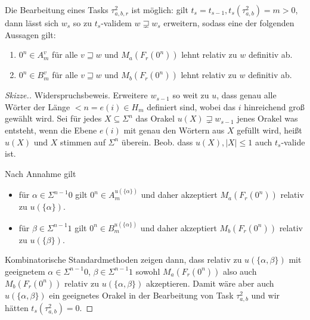 \begin{lemma}\label{lemma:myoracle-disjnp}
    Die Bearbeitung eines Tasks $\tau^2_{a,b,r}$ ist möglich: gilt $t_s=t_{s-1}, t_{s}(\tau^2_{a,b})=m>0$, dann lässt sich $w_{s}$ so zu $t_{s}$-validem $w\sqsupsetneq w_{s}$ erweitern, sodass eine der folgenden Aussagen gilt:
    \begin{enumerate}[nosep,endpenalty=10000]
        \item $0^n\in A_m^v$ für alle $v\sqsupseteq w$ und $M_a(F_r(0^n))$ lehnt relativ zu $w$ definitiv ab.
        \item $0^n\in B_m^v$ für alle $v\sqsupseteq w$ und $M_b(F_r(0^n))$ lehnt relativ zu $w$ definitiv ab.
    \end{enumerate}
\end{lemma}
\begin{proof}[Skizze.]
    Widerspruchsbeweis. Erweitere $w_{s-1}$ so weit zu $u$, dass genau alle Wörter der Länge $<n=e(i)\in H_m$ definiert sind, wobei das $i$ hinreichend groß gewählt wird. Sei für jedes $X\subseteq \Sigma^n$ das Orakel $u(X)\sqsupsetneq w_{s-1}$ jenes Orakel was entsteht, wenn die Ebene $e(i)$ mit genau den Wörtern aus $X$ gefüllt wird, heißt $u(X)$ und $X$ stimmen auf $\Sigma^n$ überein. Beob. dass $u(X), |X|\leq 1$ auch $t_{s}$-valide ist.

    Nach Annahme gilt
    \begin{itemize}[nosep]
        \item für $\alpha\in \Sigma^{n-1}0$ gilt $0^n\in A_m^{u(\{\alpha\})}$ und daher akzeptiert $M_a(F_r(0^n))$ relativ zu $u(\{\alpha\})$.
        \item für $\beta\in \Sigma^{n-1}1$ gilt $0^n\in B_m^{u(\{\alpha\})}$ und daher akzeptiert $M_b(F_r(0^n))$ relativ zu $u(\{\beta\})$.
    \end{itemize}
    Kombinatorische Standardmethoden zeigen dann, dass relativ zu $u(\{\alpha,\beta\})$ mit geeignetem $\alpha\in\Sigma^{n-1}0$, $\beta\in\Sigma^{n-1}1$ sowohl $M_a(F_r(0^n))$ also auch $M_b(F_r(0^n))$ relativ zu $u(\{\alpha,\beta\})$ akzeptieren.
    Damit wäre aber auch $u(\{\alpha,\beta\})$ ein geeignetes Orakel in der Bearbeitung von Task $\tau^2_{a,b}$ und wir hätten $t_{s}(\tau^2_{a,b})=0$.
\end{proof}
